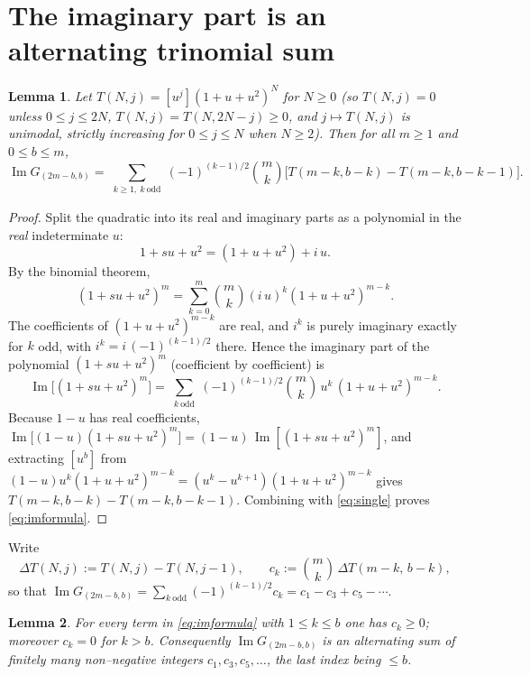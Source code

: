 \documentclass[11pt]{article}
\newtheorem{lemma}{Lemma}
\theoremstyle{definition}
\renewcommand{\Im}{\operatorname{Im}}
\newcommand{\im}{\Im}
\begin{document}
\section{The imaginary part is an alternating trinomial sum}

\begin{lemma}\label{lem:formula}
Let $T(N,j)=[u^j](1+u+u^2)^N$ for $N\ge0$ \textup{(}so $T(N,j)=0$ unless
$0\le j\le2N$, $T(N,j)=T(N,2N-j)\ge0$, and $j\mapsto T(N,j)$ is unimodal,
strictly increasing for $0\le j\le N$ when $N\ge2$\textup{)}.  Then for all
$m\ge1$ and $0\le b\le m$,
\begin{equation}\label{eq:imformula}
   \im G_{(2m-b,b)}
   =\sum_{\substack{k\ge1,\ k\ \mathrm{odd}}}(-1)^{(k-1)/2}\binom{m}{k}
      \bigl[T(m-k,b-k)-T(m-k,b-k-1)\bigr].
\end{equation}
\end{lemma}

\begin{proof}
Split the quadratic into its real and imaginary parts as a polynomial in the
\emph{real} indeterminate $u$:
\[
   1+su+u^2=(1+u+u^2)+i\,u .
\]
By the binomial theorem,
\[
   (1+su+u^2)^m=\sum_{k=0}^m\binom{m}{k}(i\,u)^k(1+u+u^2)^{m-k}.
\]
The coefficients of $(1+u+u^2)^{m-k}$ are real, and $i^k$ is purely imaginary
exactly for $k$ odd, with $i^k=i\,(-1)^{(k-1)/2}$ there.  Hence the imaginary
part of the polynomial $(1+su+u^2)^m$ (coefficient by coefficient) is
\begin{equation}\label{eq:imP}
   \im\bigl[(1+su+u^2)^m\bigr]
   =\sum_{\substack{k\ \mathrm{odd}}}(-1)^{(k-1)/2}\binom{m}{k}\,u^k\,(1+u+u^2)^{m-k}.
\end{equation}
Because $1-u$ has real coefficients, $\im\bigl[(1-u)(1+su+u^2)^m\bigr]
=(1-u)\,\im[(1+su+u^2)^m]$, and extracting $[u^b]$ from
$(1-u)u^k(1+u+u^2)^{m-k}=(u^k-u^{k+1})(1+u+u^2)^{m-k}$ gives
$T(m-k,b-k)-T(m-k,b-k-1)$.  Combining with \eqref{eq:single} proves
\eqref{eq:imformula}.
\end{proof}

Write
\begin{equation}\label{eq:ck}
   \Delta T(N,j):=T(N,j)-T(N,j-1),\qquad
   c_k:=\binom{m}{k}\,\Delta T(m-k,\,b-k),
\end{equation}
so that $\im G_{(2m-b,b)}=\sum_{k\ \mathrm{odd}}(-1)^{(k-1)/2}c_k
=c_1-c_3+c_5-\cdots$.

\begin{lemma}\label{lem:nonneg}
For every term in \eqref{eq:imformula} with $1\le k\le b$ one has $c_k\ge0$;
moreover $c_k=0$ for $k>b$.  Consequently $\im G_{(2m-b,b)}$ is an alternating
sum of finitely many non--negative integers $c_1,c_3,c_5,\dots$, the last index
being $\le b$.
\end{lemma}
\end{document}
